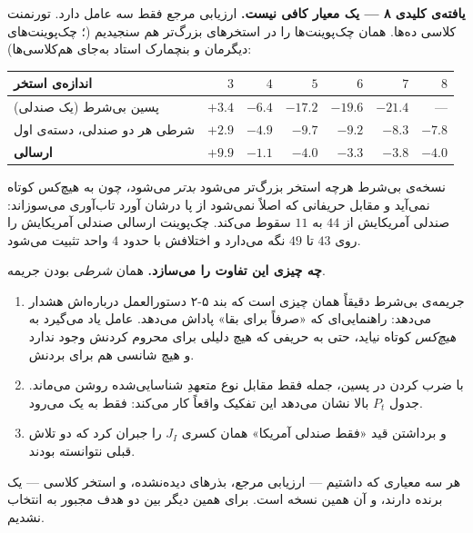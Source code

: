 \documentclass[12pt,a4paper]{article}
\begin{document}
\begin{findbox}
\textbf{یافته‌ی کلیدی ۸ — یک معیار کافی نیست.}
ارزیابی مرجع فقط سه عامل دارد. تورنمنت کلاسی ده‌ها. همان چک‌پوینت‌ها را در
استخرهای بزرگ‌تر هم سنجیدیم (؛ چک‌پوینت‌های
دیگرمان و بنچمارک استاد به‌جای هم‌کلاسی‌ها):

\vspace{4pt}
\centering\small
\begin{tabular}{lrrrrrr}
\toprule
اندازه‌ی استخر & $3$ & $4$ & $5$ & $6$ & $7$ & $8$\\
\midrule
پسین بی‌شرط (یک صندلی) & $+3.4$ & $-6.4$ & $-17.2$ & $-19.6$ & $-21.4$ & ---\\
شرطی هر دو صندلی، دسته‌ی اول & $+2.9$ & $-4.9$ & $-9.7$ & $-9.2$ & $-8.3$ & $-7.8$\\
\textbf{ارسالی} & $\mathbf{+9.9}$ & $-1.1$ & $-4.0$ & $-3.3$ & $-3.8$ & $\mathbf{-4.0}$\\
\bottomrule
\end{tabular}

\vspace{5pt}
\raggedright
نسخه‌ی بی‌شرط هرچه استخر بزرگ‌تر می‌شود \emph{بدتر} می‌شود، چون به هیچ‌کس
کوتاه نمی‌آید و مقابل حریفانی که اصلاً نمی‌شود از پا درشان آورد تاب‌آوری
می‌سوزاند: صندلی آمریکایش از $44$ به $11$ سقوط می‌کند. چک‌پوینت ارسالی
صندلی آمریکایش را روی $43$ تا $49$ نگه می‌دارد و اختلافش با 
حدود $4$ واحد تثبیت می‌شود.
\end{findbox}

\begin{answer}
\textbf{چه چیزی این تفاوت را می‌سازد.} همان \emph{شرطی} بودن جریمه.
\begin{enumerate}[leftmargin=1.6em,itemsep=2pt]
  \item جریمه‌ی بی‌شرط دقیقاً همان چیزی است که بند ۵-۲ دستورالعمل درباره‌اش
        هشدار می‌دهد: راهنمایی‌ای که «صرفاً برای بقا» پاداش می‌دهد. عامل
        یاد می‌گیرد به \emph{هیچ‌کس} کوتاه نیاید، حتی به حریفی که هیچ
        دلیلی برای محروم کردنش وجود ندارد و هیچ شانسی هم برای بردنش.
  \item با ضرب کردن در پسین، جمله فقط مقابل نوع متعهدِ شناسایی‌شده روشن
        می‌ماند. جدول $P_t$ بالا نشان می‌دهد این تفکیک واقعاً کار می‌کند:
        فقط  به یک می‌رود.
  \item و برداشتن قید «فقط صندلی آمریکا» همان کسری $J_I$ را جبران کرد که
        دو تلاش قبلی نتوانسته بودند.
\end{enumerate}
هر سه معیاری که داشتیم — ارزیابی مرجع، بذرهای دیده‌نشده، و استخر کلاسی —
یک برنده دارند، و آن همین نسخه است. برای همین دیگر بین دو هدف مجبور به
انتخاب نشدیم.
\end{answer}
\end{document}
